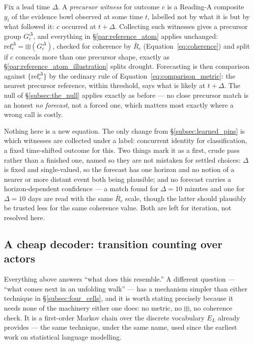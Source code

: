 \documentclass[12pt, a4paper]{article}
\begin{document}
Fix a lead time $\Delta$. A \emph{precursor witness} for outcome $c$ is
a Reading-A composite $y_i$ of the evidence bowl observed at some time
$t$, labelled not by what it is but by what followed it: $c$ occurred
at $t+\Delta$. Collecting such witnesses gives a precursor group
$G_c^{\Delta}$, and everything in \S\ref{par:reference_atom} applies
unchanged: $\mathrm{ref}_c^{\Delta}=\boxplus(G_c^{\Delta})$, checked for
coherence by $\bar R_c$ (Equation~\eqref{eq:coherence}) and split if
$c$ conceals more than one precursor shape, exactly as
\S\ref{par:reference_atom_illustration} splits $\mathrm{drought}$.
Forecasting is then comparison against $\{\mathrm{ref}_c^{\Delta}\}$ by
the ordinary rule of Equation~\eqref{eq:comparison_metric}: the
nearest precursor reference, within threshold, says what is likely at
$t+\Delta$. The null of \S\ref{subsec:the_null} applies exactly as
before --- no close precursor match is an honest \emph{no forecast},
not a forced one, which matters most exactly where a wrong call is
costly.

Nothing here is a new equation. The only change from
\S\ref{subsec:learned_pins} is which witnesses are collected under a label: concurrent identity for classification, a fixed time-shifted
outcome for this. Two things mark it as a first, crude pass rather
than a finished one, named so they are not mistaken for settled
choices: $\Delta$ is fixed and single-valued, so the forecast has one
horizon and no notion of a nearer or more distant event both being
plausible; and no forecast carries a horizon-dependent confidence ---
a match found for $\Delta=10$ minutes and one for $\Delta=10$ days are
read with the same $\bar R_c$ scale, though the latter should
plausibly be trusted less for the same coherence value. Both are left
for iteration, not resolved here.

\subsection{A cheap decoder: transition counting over actors}
\label{subsec:markov_decoder}

Everything above answers ``what does this resemble.'' A different
question --- ``what comes next in an unfolding walk'' --- has a
mechanism simpler than either technique in
\S\ref{subsec:four_cells}, and it is worth stating precisely because
it needs none of the machinery either one does: no metric, no
$\boxplus$, no coherence check. It is a first-order Markov chain over
the discrete vocabulary $E_L$ already provides --- the same technique,
under the same name, used since the earliest work on statistical
language modelling.
\end{document}
